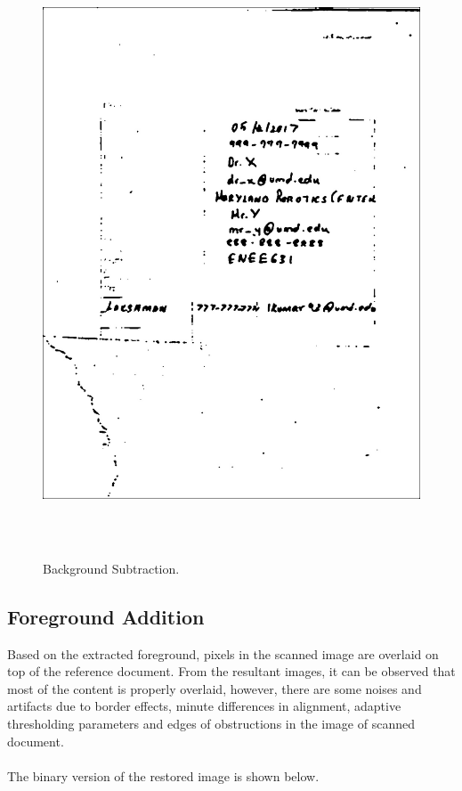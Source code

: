 \begin{figure}[th]
	\centering
	\includegraphics[height=18cm ]{Figures/background_subtraction}
	\caption[Background Subtraction]{Background Subtraction.}
	\label{fig:BackgroundSubtraction}
\end{figure}
\pagebreak
\subsection{Foreground Addition}

Based on the extracted foreground, pixels in the scanned image are overlaid on top of the reference document. From the resultant images, it can be observed that most of the content is properly overlaid, however, there are some noises and artifacts due to border effects, minute differences in alignment, adaptive thresholding parameters and edges of obstructions in the image of scanned document. 
\\
\\
The binary version of the restored image is shown below. \\ 

